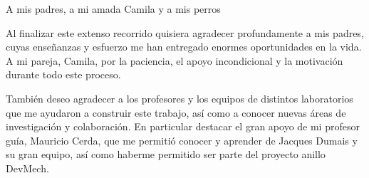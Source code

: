 \documentclass[upright, contnum]{umemoria}
\begin{document}
\begin{abstract}
Como resultado, se obtiene un algoritmo flexible que individualiza filamentos de forma autom\'atica, lo que a su vez permite la incorporaci\'on de nuevas caracter\'isticas y/o restricciones. La flexibilidad se demuestra mediante las diferentes configuraciones de par\'ametros disponibles, as\'i como la posibilidad de personalizarlos.
El algoritmo propuesto se eval\'ua en 12 im\'agenes, entre las que se tienen casos sint\'eticos, as\'i como en microt\'ubulos de planta y neuronas de rat\'on, logrando obtener casos donde no existe diferencia estad\'isticamente significativa con lo indicado por un experto, y existiendo una diferencia menor en otros casos. Finalmente, el algoritmo propuesto realiza la individualizaci\'on de los casos m\'as complejos en un tiempo de c\'omputo inferior a los 40 segundos.

\end{abstract}

\begin{dedicatoria} %
A mis padres, a mi amada Camila y a mis perros
\end{dedicatoria}

\begin{thanks} %
Al finalizar este extenso recorrido quisiera agradecer profundamente a mis padres, cuyas enseñanzas y esfuerzo me han entregado enormes oportunidades en la vida. A mi pareja, Camila, por la paciencia, el apoyo incondicional y la motivación durante todo este proceso. 

También deseo agradecer a los profesores y los equipos de distintos laboratorios que me ayudaron a construir este trabajo, así como a conocer nuevas áreas de investigación y colaboración. En particular destacar el gran apoyo de mi profesor guía, Mauricio Cerda, que me permitió conocer y aprender de Jacques Dumais y su gran equipo, así como haberme permitido ser parte del proyecto anillo DevMech.
\end{thanks}

\tableofcontents

\listoftables %
\listoffigures %

\mainmatter



%







\appendix



\renewcommand{\thesection}{A.\arabic{section}}
\end{document}
